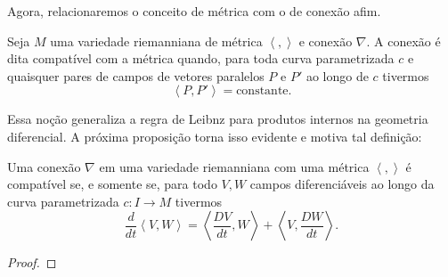 Agora, relacionaremos o conceito de métrica com o de conexão afim.
\begin{definition}
	\label{def:conexao-compativel}
	Seja $M$ uma variedade riemanniana de métrica $\left<,\right>$ e conexão $\nabla$.
	A conexão é dita compatível com a métrica quando, para toda curva parametrizada $c$ e quaisquer pares de campos de vetores paralelos $P$ e $P'$ ao longo de $c$ tivermos
	\begin{equation*}
		\left<P,P'\right> = \text{constante}.
	\end{equation*}
\end{definition}
Essa noção generaliza a regra de Leibnz para produtos internos na geometria diferencial. A próxima proposição torna isso evidente e motiva tal definição:
\begin{proposition}
	\label{prop:leibniz-compativel}
	Uma conexão $\nabla$ em uma variedade riemanniana com uma métrica $\left<,\right>$ é compatível se, e somente se, para todo $V,W$ campos diferenciáveis ao longo da curva parametrizada $c:I\to M$ tivermos
	\begin{equation}
		\label{eq:leibnz-para-covariante}
		\frac{d}{dt}\left<V,W\right> =\left<\frac{DV}{dt},W\right> +\left<V,\frac{DW}{dt}\right>.
	\end{equation}
	\begin{proof}


\end{proof}
\end{proposition}
